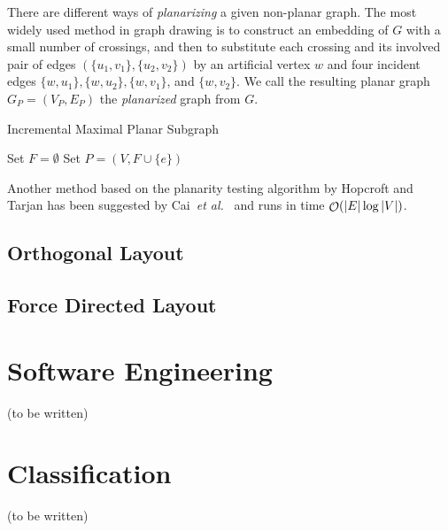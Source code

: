 \documentclass[runningheads]{cl2emult}
\begin{document}
There are different ways of
\emph{planarizing} a
given non-planar graph. The most widely used method in graph drawing
is to construct an embedding of $G$ with a small number of crossings,
and then to substitute each crossing and its involved pair of edges
$(\{u_1,v_1\},\{u_2,v_2\})$ by an artificial vertex $w$ and four
incident edges $\{w,u_1\},\{w,u_2\},\{w,v_1\}$, and $\{w,v_2\}$. We
call the resulting planar graph $G_P=(V_P,E_P)$ the
\emph{planarized} graph from $G$.

\begin{algorithm}[htbp]
\SetLine
{}
\BlankLine
\caption{Incremental Maximal Planar Subgraph}\label{alg:incremental}
 Set $F=\emptyset$\;
  {
    {
     Set $P=(V,F\cup\{e\})$\;
  }
 }
\end{algorithm}

Another method based on the planarity testing algorithm by Hopcroft
and Tarjan has been suggested by Cai~\emph{et al.}~\cite{CHT93} and
runs in time $\mathop{\cal O}(|E|\log|V|)$.

\subsection{Orthogonal Layout}\label{sec:orthogonal}
%

\subsection{Force Directed Layout}\label{sec:forcedirected}
%

\section{Software Engineering}\label{sec:softwareengineering}
%
(to be written)

\section{Classification}\label{sec:classification}
%
(to be written)
\end{document}
